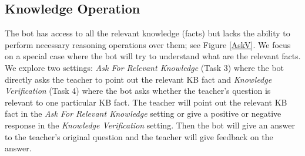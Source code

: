 \subsection{Knowledge Operation} \label{sec:knolop}
The bot has  access to all the relevant knowledge (facts)
 but lacks the ability to perform necessary reasoning operations over them;
see Figure \ref{AskV}.
We focus on a special case where the bot will try to understand what are the relevant
facts. We explore two settings:
 {\it Ask For Relevant Knowledge} (Task 3) where the bot directly asks the teacher to point out the relevant KB fact and {\it Knowledge Verification} (Task 4)  where the bot asks whether the teacher's question is relevant to one particular KB fact. The teacher will point out the relevant KB fact in the {\it Ask For Relevant Knowledge}  setting
 or give a positive or negative response in the {\it Knowledge Verification} setting.
 Then the bot will give an answer to the teacher's original question
and the teacher will give feedback on the answer.



